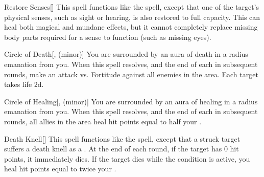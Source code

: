 \lowercase{\hypertarget{spell:Restore Senses}{}}\label{spell:Restore Senses}
\begin{ability}[\nth{2}]{\hypertarget{spell:Restore Senses}{Restore Senses}}[]
This spell functions like the  spell, except that one of the target's physical senses, such as sight or hearing, is also restored to full capacity.
This can heal both magical and mundane effects, but it cannot completely replace missing body parts required for a sense to function (such as missing eyes).
\end{ability}
\vspace{0.25em}



\lowercase{\hypertarget{spell:Circle of Death}{}}\label{spell:Circle of Death}
\begin{ability}[\nth{3}]{\hypertarget{spell:Circle of Death}{Circle of Death}}[,  (minor)]
You are surrounded by an aura of death in a \areamed radius emanation from you.
When this spell resolves, and the end of each  in subsequent rounds, make an attack vs. Fortitude against all enemies in the area.
\hit Each target takes life  \minus2d.
\end{ability}
\vspace{0.25em}



\lowercase{\hypertarget{spell:Circle of Healing}{}}\label{spell:Circle of Healing}
\begin{ability}[\nth{3}]{\hypertarget{spell:Circle of Healing}{Circle of Healing}}[,  (minor)]
You are surrounded by an aura of healing in a \areamed radius emanation from you.
When this spell resolves, and the end of each  in subsequent rounds, all allies in the area heal hit points equal to half your .
\end{ability}
\vspace{0.25em}



\lowercase{\hypertarget{spell:Death Knell}{}}\label{spell:Death Knell}
\begin{ability}[\nth{3}]{\hypertarget{spell:Death Knell}{Death Knell}}[]
This spell functions like the  spell, except that a struck target suffers a death knell as a .
At the end of each round, if the target has 0 hit points, it immediately dies.
If the target dies while the condition is active, you heal hit points equal to twice your .
\end{ability}
\vspace{0.25em}



